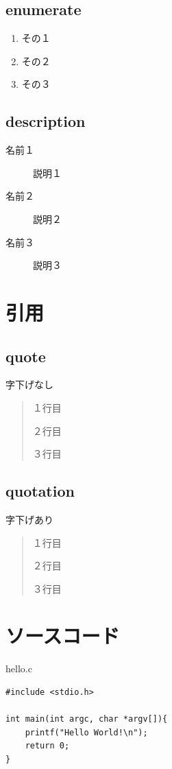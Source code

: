 \documentclass[a4paper,onecolumn,12pt]{jsarticle}
\begin{document}
\subsection{enumerate}
\begin{enumerate}
\item その１
\item その２
\item その３
\end{enumerate}

\subsection{description}
\begin{description}
  \item[名前１] 説明１
  \item[名前２] 説明２
  \item[名前３] 説明３
\end{description}

\section{引用}

\subsection{quote}
字下げなし
\begin{quote}
１行目

２行目

３行目
\end{quote}

\subsection{quotation}
字下げあり
\begin{quotation}
１行目

２行目

３行目
\end{quotation}

\section{ソースコード}


hello.c

\begin{verbatim}
#include <stdio.h>

int main(int argc, char *argv[]){
    printf("Hello World!\n");
    return 0;
}
\end{verbatim}
\end{document}
